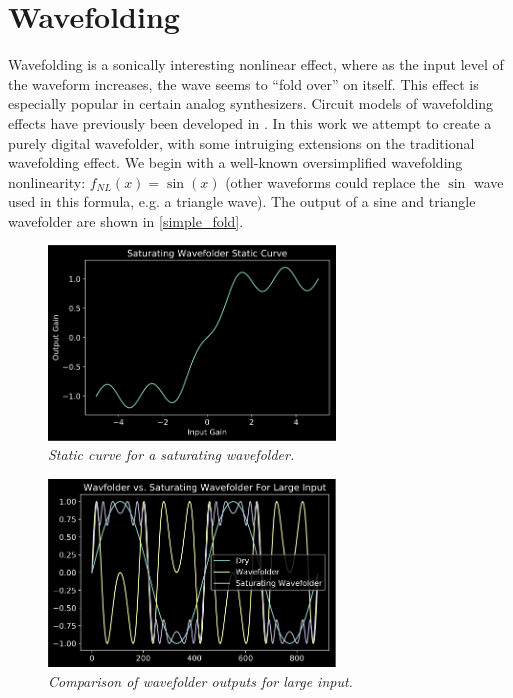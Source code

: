 \documentclass[twoside,a4paper]{article}
\begin{document}
\section{Wavefolding} \label{sec:wavefold}
%
Wavefolding is a sonically interesting nonlinear effect, where
as the input level of the waveform increases, the wave seems to
``fold over'' on itself. This effect is especially popular in
certain analog synthesizers. Circuit models of wavefolding effects
have previously been developed in \cite{DAFX-wavefold,appl_sci-wavefold}.
In this work we attempt to create a purely digital wavefolder, with
some intruiging extensions on the traditional wavefolding effect.
\newline\newline
We begin with a well-known oversimplified wavefolding nonlinearity:
$f_{NL}(x) = \sin(x)$ (other waveforms could replace the $\sin$ wave
used in this formula, e.g. a triangle wave). The output of a sine
and triangle wavefolder are shown in \cref{simple_fold}.
%
\begin{figure}[!htb]
    \center
    \includegraphics[width=3in]{../Wavefolder/Pics/sat_static.png}
    \caption{\label{sat_static}{\it Static curve for a saturating wavefolder.}}
\end{figure}
%
\begin{figure}[!htb]
    \center
    \includegraphics[width=3in]{../Wavefolder/Pics/sat_wave_large.png}
    \caption{\label{sat_wave_large}{\it Comparison of wavefolder outputs for large input.}}
\end{figure}
%
\end{document}
